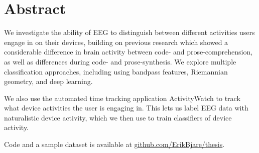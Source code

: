 \section{Abstract}

We investigate the ability of EEG to distinguish between different activities users engage in on their devices, building on previous research which showed a considerable difference in brain activity between code- and prose-comprehension, as well as differences during code- and prose-synthesis. We explore multiple classification approaches, including using bandpass features, Riemannian geometry, and deep learning.

We also use the automated time tracking application ActivityWatch to track what device activities the user is engaging in. This lets us label EEG data with naturalistic device activity, which we then use to train classifiers of device activity.

Code and a sample dataset is available at \href{https://github.com/ErikBjare/thesis}{github.com/ErikBjare/thesis}.
